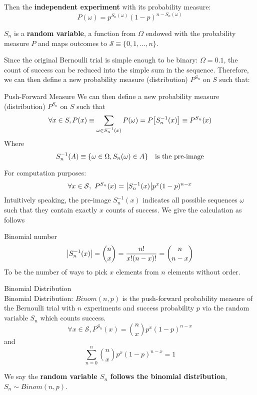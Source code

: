 \begin{clm}
Then the \textbf{independent experiment} with its probability measure: 
$$P(\omega) = p^{S_n(\omega)}(1-p)^{n-S_n(\omega)}$$
\end{clm}

\begin{rmk}
\(S_n\) is a \textbf{random variable}, a function from $\Omega$ endowed with the probability measure $P$ and maps outcomes to \(\mathcal{S} \equiv \{0, 1, \dots, n\}\).	
\end{rmk}

\noindent Since the original Bernoulli trial is simple enough to be binary: $\Omega = \qty{0, 1}$, the count of success can be reduced into the simple sum in the sequence. Therefore, we can then define a new probability measure (distribution) $P^{S_n}$ on $S$ such that: 
\begin{thm}{Push-Forward Measure}
We can then define a new probability measure (distribution) $P^{S_n}$ on $S$ such that
$$\forall x\in S, P(x) \equiv \sum_{\omega\in S_n^{-1}(x)} P(\omega) = P\qty[S_n^{-1}(x)] \equiv P^{S_n}(x)$$
Where 
$$S_n^{-1}(A) \equiv \qty{\omega\in \Omega, S_n(\omega) \in A}\quad \text{is the pre-image}$$
\end{thm}
 
 \noindent For computation purposes: 
 $$\forall x\in \mathcal{S}, \ P^{S_n}(x) = \abs{S_n^{-1}(x)} p^x(1-p)^{n-x}$$
 Intuitively speaking, the pre-image $S_n^{-1}(x)$ indicates all possible sequences $\omega$ such that they contain exactly $x$ counts of success. We give the calculation as follows

\begin{df}{Binomial number}
$$\abs{S_n^{-1}(x)} = \binom{n}{x} = \frac{n!}{x!(n-x)!} = \binom{n}{n-x}$$
To be the number of ways to pick $x$ elements from $n$ elements without order. 	
\end{df}


\begin{df}{Binomial Distribution}\\
Binomial Distribution: $Binom(n, p)$ is the push-forward probability measure of the Bernoulli trial with $n$ experiments and success probability $p$ via the random variable $S_n$ which counts success. 
$$\forall x \in \mathcal{S}, P^{S_n}(x) =  \binom{n}{x} p^x(1-p)^{n-x}$$
and
  \[\sum_{n=0}^n \binom{n}{x} p^x (1-p)^{n-x} = 1\]
\end{df}

\noindent We say the \textbf{random variable $S_n$ follows the binomial distribution}, $S_n\sim Binom(n, p)$.  


